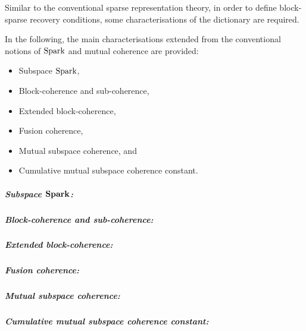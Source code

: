 Similar to the conventional sparse representation theory, in order to define block-sparse recovery conditions, some characterisations of the dictionary are required.

In the following, the main characterisations extended from the conventional notions of $\mathrm{Spark}$ and mutual coherence are provided:
\begin{itemize}
\item Subspace $\mathrm{Spark}$,
\item Block-coherence and sub-coherence,
\item Extended block-coherence,
\item Fusion coherence,
\item Mutual subspace coherence, and
\item Cumulative mutual subspace coherence constant.
\end{itemize}
\subparagraph{Subspace $\boldsymbol{\mathrm{Spark}}$:}

\subparagraph{Block-coherence and sub-coherence:}

\subparagraph{Extended block-coherence:}

\subparagraph{Fusion coherence:}

\subparagraph{Mutual subspace coherence:}

\subparagraph{Cumulative mutual subspace coherence constant:} 
